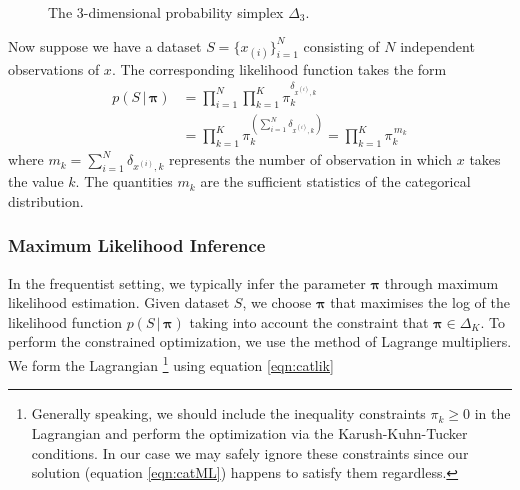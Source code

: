 \documentclass[final,3p,times,twocolumn]{elsarticle}
\let\bs\boldsymbol
\begin{document}
\begin{figure}
\caption{The 3-dimensional probability simplex $\Delta_3$.}
\label{fig:simplex}
\end{figure}

Now suppose we have a dataset $S=\{x_{(i)}\}_{i=1}^N$ consisting of $N$ independent observations of $x$.
The corresponding likelihood function takes the form
\begin{equation}
\label{eqn:catlik}
\begin{split}
p(S\,|\,\bs \pi) &= \prod_{i=1}^N \prod_{k=1}^K \pi_k^{\delta_{x^{(i)},k}} \\ &= \prod_{k=1}^K \pi_k^{\left(\sum_{i=1}^N \delta_{x^{(i)},k}\right)} = \prod_{k=1}^K \pi_k^{\,m_k}
\end{split}
\end{equation}
where $m_k = \sum_{i=1}^N \delta_{x^{(i)}, k}$ represents the number of observation in which $x$ takes the value $k$.
The quantities $m_k$ are the sufficient statistics of the categorical distribution.

\subsubsection*{\normalfont \small \bfseries Maximum Likelihood Inference}
In the frequentist setting, we typically infer the parameter $\bs \pi$ through maximum likelihood estimation.
Given dataset $S$, we choose $\bs \pi$ that maximises the log of the likelihood function $p(S\,|\,\bs \pi)$ taking into account the constraint that $\bs \pi \in \Delta_K$.
To perform the constrained optimization, we use the method of Lagrange multipliers. We form the Lagrangian
\footnote{Generally speaking, we should include the inequality constraints $\pi_k \geq 0$ in the Lagrangian and perform the optimization via the Karush-Kuhn-Tucker conditions.
In our case we may safely ignore these constraints since our solution (equation \ref{eqn:catML}) happens to satisfy them regardless.}
using equation \ref{eqn:catlik}
\end{document}
